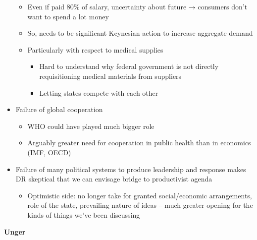 \begin{itemize}
  \begin{itemize}
  \tightlist
  \item
    Even if paid 80\% of salary, uncertainty about future → consumers
    don't want to spend a lot money
  \item
    So, needs to be significant Keynesian action to increase aggregate
    demand
  \item
    Particularly with respect to medical supplies

    \begin{itemize}
    \tightlist
    \item
      Hard to understand why federal government is not directly
      requisitioning medical materials from suppliers
    \item
      Letting states compete with each other
    \end{itemize}
  \end{itemize}
\item
  Failure of global cooperation

  \begin{itemize}
  \tightlist
  \item
    WHO could have played much bigger role
  \item
    Arguably greater need for cooperation in public health than in
    economics (IMF, OECD)
  \end{itemize}
\item
  Failure of many political systems to produce leadership and response
  makes DR skeptical that we can envisage bridge to productivist agenda

  \begin{itemize}
  \tightlist
  \item
    Optimistic side: no longer take for granted social/economic
    arrangements, role of the state, prevailing nature of ideas -- much
    greater opening for the kinds of things we've been discussing
  \end{itemize}
\end{itemize}

\textbf{Unger}

